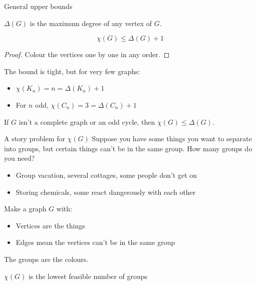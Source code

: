 \documentclass{beamer}
\begin{document}
\begin{frame}{General upper bounds}
  \begin{definition}$\Delta(G)$ is the maximum degree of any vertex of $G$.
\end{definition}
    
\begin{lemma}
$$\chi(G)\leq \Delta(G)+1$$
\end{lemma}
\begin{proof}
Colour the vertices one by one in any order.
  \end{proof}
\begin{block}{The bound is tight, but for very few graphs:}
  \begin{itemize}
    \item $\chi(K_n)=n=\Delta(K_n)+1$
    \item For $n$ odd, $\chi(C_n)=3=\Delta(C_n)+1$
  \end{itemize}
  \begin{theorem}
If $G$ isn't a complete graph or an odd cycle, then $\chi(G)\leq \Delta(G)$.
    \end{theorem}

  \end{block}

  \end{frame}

\begin{frame}{A story problem for $\chi(G)$}
  Suppose you have some things you want to separate into groups, but certain things can't be in the same group.  How many groups do you need?
  \begin{itemize}
  \item Group vacation, several cottages, some people don't get on
  \item Storing chemicals, some react dangerously with each other
    \end{itemize}
\begin{block}{Make a graph $G$ with:}
  \begin{itemize}
  \item Vertices are the things
  \item Edges mean the vertices can't be in the same group
  \end{itemize}
  The groups are the colours.
\end{block}
\begin{block}{$\chi(G)$ is the lowest feasible number of groups}
  \end{block}
  


  \end{frame}
\end{document}
